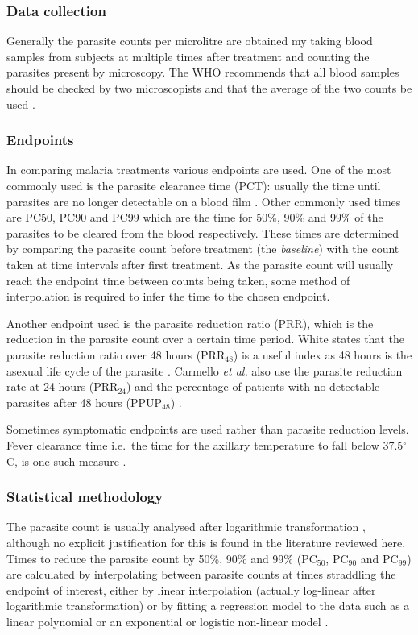 \subsubsection*{Data collection}
Generally the parasite counts per microlitre are obtained my taking blood samples from subjects at multiple times after treatment and counting the parasites present by microscopy. The WHO recommends that all blood samples should be checked by two microscopists and that the average of the two counts be used \cite{protocolWHO}.

\subsubsection*{Endpoints}
In comparing malaria treatments various endpoints are used. One of the most commonly used is the parasite clearance time (PCT): usually the time until parasites are no longer detectable on a blood film \cite{white}. Other commonly used times are PC50, PC90 and PC99 which are the time for 50\%, 90\% and 99\% of the parasites to be cleared from the blood respectively. These times are determined by comparing the parasite count before treatment (the \textit{baseline}) with the count taken at time intervals after first treatment. As the parasite count will usually reach the endpoint time between counts being taken, some method of interpolation is required to infer the time to the chosen endpoint.

Another endpoint used is the parasite reduction ratio (PRR), which is the reduction in the parasite count over a certain time period. White states that the parasite reduction ratio over 48 hours (PRR$_{48}$) is a useful index as 48 hours is the asexual life cycle of the parasite \cite{white}. Carmello \textit{et al.} also use the parasite reduction rate at 24 hours (PRR$_{24}$) and the percentage of patients with no detectable parasites after 48 hours (PPUP$_{48}$) \cite{carmello}.

Sometimes symptomatic endpoints are used rather than parasite reduction levels.  Fever clearance time i.e.\ the time for the axillary temperature to fall below 37.5$^\circ$C, is one such measure \cite{bell,newton}.

\subsubsection*{Statistical methodology}
The parasite count is usually analysed after logarithmic transformation \cite{vries, wootton, carmello}, although no explicit justification for this is found in the literature reviewed here. Times to reduce the parasite count by 50\%, 90\% and 99\% (PC$_{50}$, PC$_{90}$ and PC$_{99}$) are calculated by interpolating between parasite counts at times straddling the endpoint of interest, either by linear interpolation (actually log-linear after logarithmic transformation)\cite{newton, carmello} or by fitting a regression model to the data such as a linear polynomial or an exponential \cite{vries} or logistic non-linear model \cite{wootton}.

